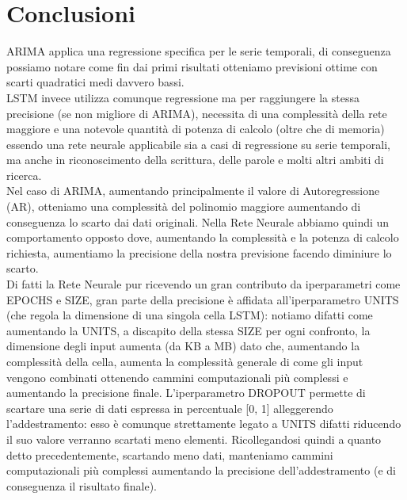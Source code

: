 \documentclass[a4paper,12pt]{article}
\begin{document}
    \section{Conclusioni}ARIMA applica una regressione specifica per le serie 
    temporali, di conseguenza possiamo notare come fin dai primi risultati 
    otteniamo previsioni ottime con scarti quadratici medi davvero bassi.\\
    LSTM invece utilizza comunque regressione ma per raggiungere la stessa 
    precisione (se non migliore di ARIMA), necessita di una complessità della 
    rete maggiore e una notevole quantità di potenza di calcolo (oltre che di 
    memoria) essendo una rete neurale applicabile sia a casi di regressione su 
    serie temporali, ma anche in riconoscimento della scrittura, delle parole e
    molti altri ambiti di ricerca.\\
    Nel caso di ARIMA, aumentando principalmente il valore di Autoregressione 
    (AR), otteniamo una complessità del polinomio maggiore aumentando di
    conseguenza lo scarto dai dati originali. Nella Rete Neurale abbiamo quindi
    un comportamento opposto dove, aumentando la complessità e la potenza di 
    calcolo richiesta, aumentiamo la precisione della nostra previsione 
    facendo diminiure lo scarto.\\
    Di fatti la Rete Neurale pur ricevendo un gran contributo da iperparametri
    come EPOCHS e SIZE, gran parte della precisione è affidata 
    all'iperparametro UNITS (che regola la dimensione di una singola cella 
    LSTM): notiamo difatti come aumentando la UNITS, a discapito della stessa
    SIZE per ogni confronto, la dimensione degli input aumenta
    (da KB a MB) dato che, aumentando la complessità della cella, aumenta la
    complessità generale di come gli input vengono combinati ottenendo
    cammini computazionali più complessi e aumentando la precisione finale.
    L'iperparametro DROPOUT permette di scartare una serie di dati espressa in
    percentuale [0, 1] alleggerendo l'addestramento: esso è comunque 
    strettamente legato a UNITS difatti riducendo il suo valore verranno 
    scartati meno elementi. Ricollegandosi quindi a quanto detto 
    precedentemente, scartando meno dati, manteniamo cammini computazionali più
    complessi aumentando la precisione dell'addestramento (e di conseguenza
    il risultato finale).
\end{document}
